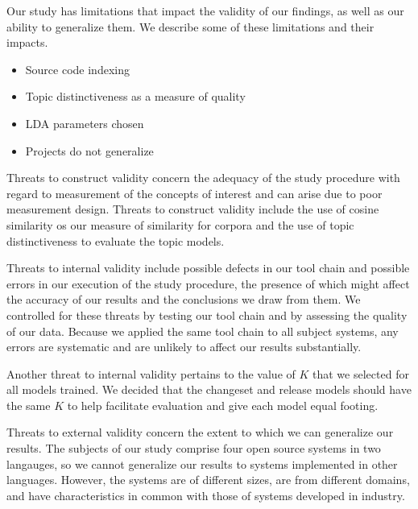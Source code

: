 
Our study has limitations that impact the validity of our findings,
as well as our ability to generalize them.
We describe some of these limitations and their impacts.

\begin{itemize}

\item Source code indexing
\item Topic distinctiveness as a measure of quality
\item LDA parameters chosen
\item Projects do not generalize

\end{itemize}

Threats to construct validity concern the adequacy of the study procedure with regard to
measurement of the concepts of interest and can arise due to poor measurement design.
Threats to construct validity include the use of cosine similarity os our measure of similarity for corpora
and the use of topic distinctiveness to evaluate the topic models.

Threats to internal validity include possible defects in our tool chain and possible errors
in our execution of the study procedure,
the presence of which might affect the accuracy of our results and the conclusions we draw from them.
We controlled for these threats by testing our tool chain and by assessing the quality of our data.
Because we applied the same tool chain to all subject systems, any errors are systematic and are unlikely
to affect our results substantially.

Another threat to internal validity pertains to the value of $K$ that we selected for all models trained.
We decided that the changeset and release models should have the same $K$
to help facilitate evaluation and give each model equal footing.

Threats to external validity concern the extent to which we can generalize our results.
The subjects of our study comprise four open source systems in two langauges,
so we cannot generalize our results to systems implemented in other languages.
However, the systems are of different sizes, are from different domains, and
have characteristics in common with those of systems developed in industry.

